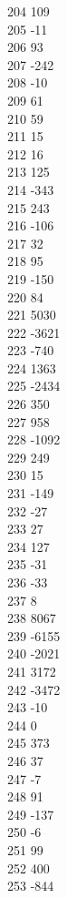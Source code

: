 { 204	109 \\
 205	-11 \\
 206	93 \\
 207	-242 \\
 208	-10 \\
 209	61 \\
 210	59 \\
 211	15 \\
 212	16 \\
 213	125 \\
 214	-343 \\
 215	243 \\
 216	-106 \\
 217	32 \\
 218	95 \\
 219	-150 \\
 220	84 \\
 221	5030 \\
 222	-3621 \\
 223	-740 \\
 224	1363 \\
 225	-2434 \\
 226	350 \\
 227	958 \\
 228	-1092 \\
 229	249 \\
 230	15 \\
 231	-149 \\
 232	-27 \\
 233	27 \\
 234	127 \\
 235	-31 \\
 236	-33 \\
 237	8 \\
 238	8067 \\
 239	-6155 \\
 240	-2021 \\
 241	3172 \\
 242	-3472 \\
 243	-10 \\
 244	0 \\
 245	373 \\
 246	37 \\
 247	-7 \\
 248	91 \\
 249	-137 \\
 250	-6 \\
 251	99 \\
 252	400 \\
 253	-844 \\
}
